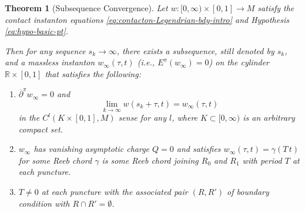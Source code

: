 \documentclass[reqno]{amsart}
\def\R{\ifmmode{\mathbb R}\else{$\mathbb R$}\fi} %
\theoremstyle{theorem}
\newtheorem{thm}{Theorem}[section]
\theoremstyle{definition}
\numberwithin{equation}{section}
\def\R{{\mathbb R}}
\def\R{{\mathbb R}}
\def\delbar{{\overline \partial}}
\def\R{\ifmmode{\mathbb R}\else{$\mathbb R$}\fi} %
\def\R{{\mathbb R}}
\def\R{{\mathbb R}}
\def\delbar{{\overline \partial}}
\begin{document}
\begin{thm}[Subsequence Convergence]\label{thm:subsequence}
Let $w:[0, \infty)\times [0,1]\to M$ satisfy the contact instanton equations \eqref{eq:contacton-Legendrian-bdy-intro}
and Hypothesis \eqref{eq:hypo-basic-pt}.

Then for any sequence $s_k\to \infty$, there exists a subsequence, still denoted by $s_k$, and a
massless instanton $w_\infty(\tau,t)$ (i.e., $E^\pi(w_\infty) = 0$)
on the cylinder $\R \times [0,1]$  that satisfies the following:
\begin{enumerate}
\item $\delbar^\pi w_\infty = 0$ and
$$
\lim_{k\to \infty}w(s_k + \tau, t) = w_\infty(\tau,t)
$$
in the $C^l(K \times [0,1], M)$ sense for any $l$, where $K\subset [0,\infty)$ is an arbitrary compact set.
\item $w_\infty$ has vanishing asymptotic charge $Q = 0$ and satisfies $w_\infty(\tau,t)= \gamma(T\, t)$
for some Reeb chord $\gamma$ is some Reeb chord joining $R_0$ and $R_1$ with period $T$ at each puncture.
\item $T \neq 0$ at each  puncture with the associated pair $(R,R')$ of boundary condition with $R \cap R'
= \emptyset$.
\end{enumerate}
\end{thm}
\end{document}
